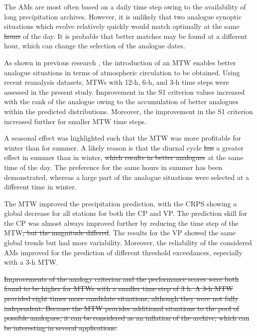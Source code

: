 \documentclass[hess, manuscript]{copernicus}
\providecommand{\DIFadd}[1]{{\protect\color{blue}\uwave{#1}}} %
\providecommand{\DIFdel}[1]{{\protect\color{red}\sout{#1}}}                      %
\providecommand{\DIFaddbegin}{} %
\providecommand{\DIFaddend}{} %
\providecommand{\DIFdelbegin}{} %
\providecommand{\DIFdelend}{} %
\begin{document}
	
	\conclusions  %
	\label{sec:conclusions}

	The AMs are most often based on a daily time step owing to the availability of long precipitation archives. However, it is unlikely that two analogue synoptic situations which evolve relatively quickly would match optimally at the same \DIFdelbegin \DIFdel{hours }\DIFdelend \DIFaddbegin \DIFadd{hour }\DIFaddend of the day. It is probable that better matches may be found at a different hour, which can change the selection of the analogue dates.

	As shown in previous research \citep{Finet2008}, the introduction of an MTW enables better analogue situations in terms of atmospheric circulation to be obtained. Using recent reanalysis datasets, MTWs with 12-h, 6-h, and 3-h time steps were assessed in the present study. Improvement in the S1 criterion values increased with the rank of the analogue owing to the accumulation of better analogues within the predicted distributions. Moreover, the improvement in the S1 criterion increased further for smaller MTW time steps.

	A seasonal effect was highlighted such that the MTW was more profitable for winter than for summer. A likely reason is that the diurnal cycle \DIFdelbegin \DIFdel{has }\DIFdelend \DIFaddbegin \DIFadd{having }\DIFaddend a greater effect in summer than in winter, \DIFdelbegin \DIFdel{which results in better analogues }\DIFdelend \DIFaddbegin \DIFadd{better analogues are found }\DIFaddend at the same time of the day. The preference for the same hours in summer has been demonstrated, whereas a large part of the analogue situations were selected at a different time in winter.

	The MTW improved the precipitation prediction, with the CRPS showing a global decrease for all stations for both the CP and VP. The prediction skill for the CP was almost always improved further by reducing the time step of the MTW\DIFdelbegin \DIFdel{, but the magnitude differed}\DIFdelend . The results for the VP showed the same global trends but had more variability. Moreover, the reliability of the considered AMs improved for the prediction of different threshold exceedances, especially with a 3-h MTW.

	\DIFdelbegin \DIFdel{Improvements of the analogy criterion and the performance scores were both found to be higher for MTWs with a smaller time step of 3 h. A 3-h MTW provided eight times more candidate situations, although they were not fully independent. Because the MTW provides additional situations to the pool of possible analogues, it can be considered as an inflation of the archive, which can be interesting in several applications.
	}%
\end{document}
